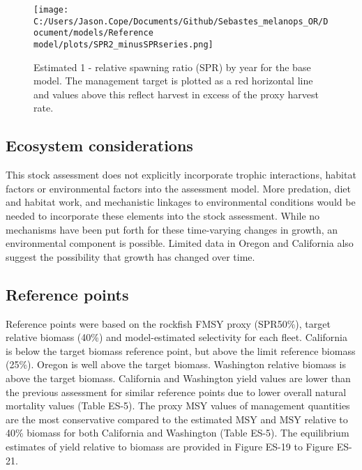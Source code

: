 \documentclass[11pt,
  english,
  letterpaper,
]{article}
\begin{document}


\begin{figure}
\centering
\texttt{[image: C:/Users/Jason.Cope/Documents/Github/Sebastes\_melanops\_OR/Document/models/Reference model/plots/SPR2\_minusSPRseries.png]}
\caption{Estimated 1 - relative spawning ratio (SPR) by year for the base model. The management target is plotted as a red horizontal line and values above this reflect harvest in excess of the proxy harvest rate.\label{fig:es-1-spr}}
\end{figure}

\clearpage

\hypertarget{ecosystem-considerations}{%
\subsection*{Ecosystem considerations}\label{ecosystem-considerations}}

This stock assessment does not explicitly incorporate trophic interactions, habitat factors or environmental factors into the assessment model. More predation, diet and habitat work, and mechanistic linkages to environmental conditions would be needed to incorporate these elements into the stock assessment. While no mechanisms have been put forth for these time-varying changes in growth, an environmental component is possible. Limited data in Oregon and California also suggest the possibility that growth has changed over time.

\hypertarget{reference-points}{%
\subsection*{Reference points}\label{reference-points}}

Reference points were based on the rockfish FMSY proxy (SPR50\%), target relative biomass (40\%) and model-estimated selectivity for each fleet. California is below the target biomass reference point, but above the limit reference biomass (25\%). Oregon is well above the target biomass. Washington relative biomass is above the target biomass. California and Washington yield values are lower than the previous assessment for similar reference points due to lower overall natural mortality values (Table ES-5). The proxy MSY values of management quantities are the most conservative compared to the estimated MSY and MSY relative to 40\% biomass for both California and Washington (Table ES-5). The equilibrium estimates of yield relative to biomass are provided in Figure ES-19 to Figure ES-21.
\end{document}
